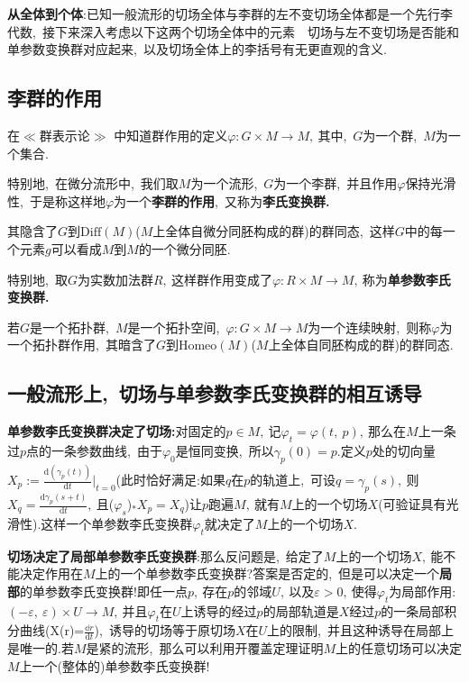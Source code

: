 \textbf{从全体到个体}:已知一般流形的切场全体与李群的左不变切场全体都是一个先行李代数,\ 接下来深入考虑以下这两个切场全体中的元素\ \raisebox{0.5mm}{------}\ 切场与左不变切场是否能和单参数变换群对应起来,\ 以及切场全体上的李括号有无更直观的含义.

\subsection{李群的作用}
在$\ll\text{群表示论} \gg$ 中知道群作用的定义$\varphi:G\times M\rightarrow M,\ $其中,\ $G$为一个群,\ $M$为一个集合.

特别地,\ 在微分流形中,\ 我们取$M$为一个流形,\ $G$为一个李群,\ 并且作用$\varphi$保持光滑性,\ 于是称这样地$\varphi$为一个\textbf{李群的作用},\ 又称为\textbf{李氏变换群.}

其隐含了$G$到$\mathrm{Diff}(M)$($M$上全体自微分同胚构成的群)的群同态,\ 这样$G$中的每一个元素$g$可以看成$M$到$M$的一个微分同胚.

特别地,\ 取$G$为实数加法群$R,\ $这样群作用变成了$\varphi:R\times M\rightarrow M,\ $称为\textbf{单参数李氏变换群.}
\begin{note}[拓扑群的作用]
	若$G$是一个拓扑群,\ $M$是一个拓扑空间,\ $\varphi:G\times M\rightarrow M$为一个连续映射,\ 则称$\varphi$为一个拓扑群作用,\ 其暗含了$G$到$\mathrm{Homeo}(M)$($M$上全体自同胚构成的群)的群同态.
\end{note}
\subsection{一般流形上,\ 切场与单参数李氏变换群的相互诱导}
\textbf{单参数李氏变换群决定了切场:}对固定的$p\in M,\ $记$\varphi_t=\varphi(t,\ p),\ $那么在$M$上一条过$p$点的一条参数曲线,\ 由于$\varphi_0$是恒同变换,\ 所以$\gamma_p(0)=p.$定义$p$处的切向量$X_p:=\frac{\mathrm{d}(\gamma_p(t))}{\mathrm{d}t}|_{t=0}$(此时恰好满足:如果$q$在$p$的轨道上,\ 可设$q=\gamma_p(s),\ $则$X_q=\frac{\mathrm{d}\gamma_p(s+t)}{\mathrm{d}t},\ $且($\varphi_s$)$_*X_p=X_q$)让$p$跑遍$M,\ $就有$M$上的一个切场$X$(可验证具有光滑性).这样一个单参数李氏变换群$\varphi_t$就决定了$M$上的一个切场$X.$

\textbf{切场决定了\textbf{局部}单参数李氏变换群}:那么反问题是,\ 给定了$M$上的一个切场$X,\ $能不能决定作用在$M$上的一个单参数李氏变换群?答案是否定的,\ 但是可以决定一个\textbf{局部}的单参数李氏变换群!即任一点$p,\ $存在$p$的邻域$U,\ $以及$\varepsilon>0,\ $使得$\varphi_t$为局部作用:$(-\varepsilon,\ \varepsilon)\times U\rightarrow M,\ $并且$\varphi_t$在$U$上诱导的经过$p$的局部轨道是$X$经过$p$的一条局部积分曲线(X(r)=$\frac{\mathbb{d}r}{\mathrm{d}t}$),\ 诱导的切场等于原切场$X$在$U$上的限制,\ 并且这种诱导在局部上是唯一的.若$M$是紧的流形,\ 那么可以利用开覆盖定理证明$M$上的任意切场可以决定$M$上一个(整体的)单参数李氏变换群!


